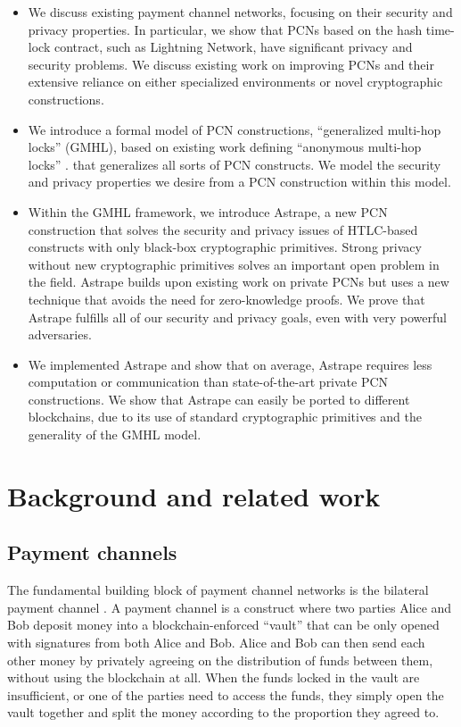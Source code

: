 \documentclass[USenglish,oneside,twocolumn]{article}
\begin{document}
\begin{itemize}
    \item We discuss existing payment channel networks, focusing on their security and privacy properties. In particular, we show that PCNs based on the hash time-lock contract, such as Lightning Network, have significant privacy and security problems. We discuss existing work on improving PCNs and their extensive reliance on either specialized environments or novel cryptographic constructions.
    \item We introduce a formal model of PCN constructions, ``generalized multi-hop locks'' (GMHL), based on existing work defining ``anonymous multi-hop locks'' \cite{malavolta2019anonymous}. that generalizes all sorts of PCN constructs. We model the security and privacy properties we desire from a PCN construction within this model.
    \item Within the GMHL framework, we introduce Astrape, a new PCN construction that solves the security and privacy issues of HTLC-based constructs with only black-box cryptographic primitives. Strong privacy without new cryptographic primitives solves an important open problem in the field. Astrape builds upon existing work \cite{malavolta2017concurrency} on private PCNs but uses a new technique that avoids the need for zero-knowledge proofs. We prove that Astrape fulfills all of our security and privacy goals, even with very powerful adversaries.
    \item We implemented Astrape and show that on average, Astrape requires less computation or communication than state-of-the-art private PCN constructions. We show that Astrape can easily be ported to different blockchains, due to its use of standard cryptographic primitives and the generality of the GMHL model.
\end{itemize}


\section{Background and related work} \label{sec:bg}

\subsection{Payment channels}

The fundamental building block of payment channel networks is the bilateral payment channel \cite{mccorry2016towards}. A payment channel is a construct where two parties Alice and Bob deposit money into a blockchain-enforced ``vault'' that can be only opened with signatures from both Alice and Bob. Alice and Bob can then send each other money by privately agreeing on the distribution of funds between them, without using the blockchain at all. When the funds locked in the vault are insufficient, or one of the parties need to access the funds, they simply open the vault together and split the money according to the proportion they agreed to.
\end{document}
